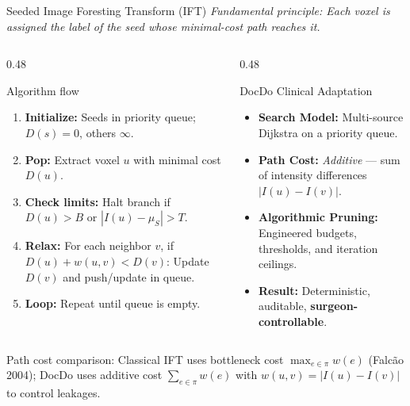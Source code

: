 \documentclass[aspectratio=169,11pt,xcolor=table]{beamer}
\begin{document}
\begin{frame}{Seeded Image Foresting Transform (IFT)}
\footnotesize
\textit{Fundamental principle: Each voxel is assigned the label of the seed whose minimal-cost path reaches it.}

\vspace{0.15cm}
\begin{columns}[T]
\begin{column}{0.48\linewidth}
  \begin{block}{Algorithm flow}
    \scriptsize
    \begin{enumerate}
    \setlength\itemsep{1pt}
    \item \textbf{Initialize:} Seeds in priority queue; $D(s)=0$, others $\infty$.
    \item \textbf{Pop:} Extract voxel $u$ with minimal cost $D(u)$.
    \item \textbf{Check limits:} Halt branch if $D(u) > B$ or $|I(u)-\mu_S| > T$.
    \item \textbf{Relax:} For each neighbor $v$, if $D(u) + w(u,v) < D(v)$:
      Update $D(v)$ and push/update in queue.
    \item \textbf{Loop:} Repeat until queue is empty.
    \end{enumerate}
  \end{block}
\end{column}
\begin{column}{0.48\linewidth}
  \begin{block}{DocDo Clinical Adaptation}
    \begin{itemize}
    \setlength\itemsep{4pt}
    \item \textbf{Search Model:} Multi-source Dijkstra on a priority queue.
    \item \textbf{Path Cost:} \emph{Additive} --- sum of intensity differences $|I(u)-I(v)|$.
    \item \textbf{Algorithmic Pruning:} Engineered \alert{budgets}, \alert{thresholds}, and \alert{iteration ceilings}.
    \item \textbf{Result:} Deterministic, auditable, \textbf{surgeon-controllable}.
    \end{itemize}
  \end{block}
\end{column}
\end{columns}
\vspace{0.1cm}
{\scriptsize\color{gray} Path cost comparison: Classical IFT uses bottleneck cost $\max_{e\in\pi} w(e)$ (Falc\~ao 2004); DocDo uses additive cost $\sum_{e\in\pi} w(e)$ with $w(u,v) = |I(u)-I(v)|$ to control leakages.}
\end{frame}
\end{document}
